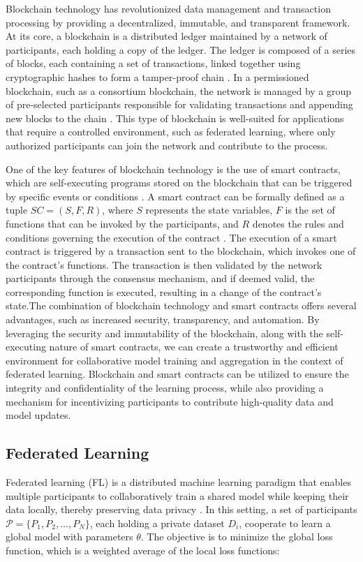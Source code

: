 \documentclass[a4paper]{cas-dc}
\begin{document}
Blockchain technology has revolutionized data management and transaction processing by providing a decentralized, immutable, and transparent framework. At its core, a blockchain is a distributed ledger maintained by a network of participants, each holding a copy of the ledger. The ledger is composed of a series of blocks, each containing a set of transactions, linked together using cryptographic hashes to form a tamper-proof chain \cite{25}. In a permissioned blockchain, such as a consortium blockchain, the network is managed by a group of pre-selected participants responsible for validating transactions and appending new blocks to the chain \cite{23}. This type of blockchain is well-suited for applications that require a controlled environment, such as federated learning, where only authorized participants can join the network and contribute to the process.

One of the key features of blockchain technology is the use of smart contracts, which are self-executing programs stored on the blockchain that can be triggered by specific events or conditions \cite{25}. A smart contract can be formally defined as a tuple $SC = (S, F, R)$, where $S$ represents the state variables, $F$ is the set of functions that can be invoked by the participants, and $R$ denotes the rules and conditions governing the execution of the contract \cite{24}. The execution of a smart contract is triggered by a transaction sent to the blockchain, which invokes one of the contract's functions. The transaction is then validated by the network participants through the consensus mechanism, and if deemed valid, the corresponding function is executed, resulting in a change of the contract's state.The combination of blockchain technology and smart contracts offers several advantages, such as increased security, transparency, and automation. By leveraging the security and immutability of the blockchain, along with the self-executing nature of smart contracts, we can create a trustworthy and efficient environment for collaborative model training and aggregation in the context of federated learning. Blockchain and smart contracts can be utilized to ensure the integrity and confidentiality of the learning process, while also providing a mechanism for incentivizing participants to contribute high-quality data and model updates\cite{20}.


\subsection{Federated Learning}
Federated learning (FL) is a distributed machine learning paradigm that enables multiple participants to collaboratively train a shared model while keeping their data locally, thereby preserving data privacy \cite{4,17}. In this setting, a set of participants $\mathcal{P} = \{P_1, P_2, ..., P_N\}$, each holding a private dataset $D_i$, cooperate to learn a global model with parameters $\theta$. The objective is to minimize the global loss function, which is a weighted average of the local loss functions:
\end{document}
